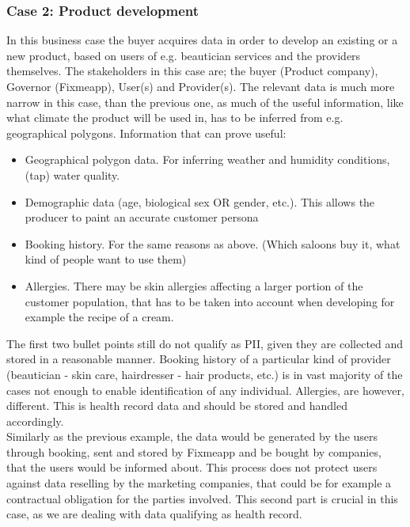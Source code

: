 \documentclass[english, 12pt, a4paper, sci, utf8, a-2b, online]{aaltothesis}
\theoremstyle{change}
\theoremstyle{theoremstyle}
\begin{document}
\subsubsection{Case 2: Product development}
In this business case the buyer acquires data in order to develop an existing or a new product, based on users of e.g. 
beautician services and the providers themselves. The stakeholders in this case are; the buyer (Product company), Governor (Fixmeapp), User(s) and Provider(s). The relevant data is much more narrow in this case, than the previous one, as much of the useful information, like what climate the product will be used in, has to be inferred from e.g. geographical polygons. Information that can prove useful:
\begin{itemize}
    \item Geographical polygon data. For inferring weather and humidity conditions, (tap) water quality.
    \item Demographic data (age, biological sex OR gender, etc.). This allows the producer to paint an accurate customer persona
    \item Booking history. For the same reasons as above. (Which saloons buy it, what kind of people want to use them)
    \item Allergies. There may be skin allergies affecting a larger portion of the customer population, that has to be taken into account when developing for example the recipe of a cream.
\end{itemize}
The first two bullet points still do not qualify as PII, given they are collected and stored in a reasonable manner. Booking history of a particular kind of provider (beautician - skin care, hairdresser - hair products, etc.) is in vast majority of the cases not enough to enable identification of any individual. Allergies, are however, different. This is health record data and should be stored and handled accordingly. \\
Similarly as the previous example, the data would be generated by the users through booking, sent and stored by Fixmeapp and be bought by companies, that the users would be informed about. This process does not protect users against data reselling by the marketing companies, that could be for example a contractual obligation for the parties involved. This second part is crucial in this case, as we are dealing with data qualifying as health record.\\
\end{document}
